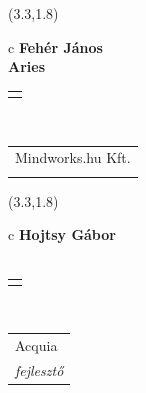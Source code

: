 \documentclass[11pt]{article}
\begin{document}
\makebox(3.3,1.8){
  \renewcommand\arraystretch{1.3}
  \begin{tabular}[c]{c}
    \hspace{8.5mm}
    \LARGE\bf{ Fehér János }\\
    \hspace{8.5mm}
    \Large{ Aries }\\
    \renewcommand\arraystretch{3}
    \begin{tabular}[c]{c}
      \centering
      \fontfamily{phv}\selectfont{
        \textbf{
          \textsc{
            \scriptsize{
            \color{Bright}{ Ismerkedő }\color{Bright}{ Webmester }\color{Bright}{ Sminkmester }\color{Dark}{ Programozó }
            }
          }
        }
      }
    \end{tabular}
    \\
    \renewcommand\arraystretch{1}
    \begin{tabular}{p{3.3in}}
      \hspace{.7cm}Mindworks.hu Kft.\\
      \hspace{.7cm}\emph{  }\\
    \end{tabular}
  \end{tabular}
}

\makebox(3.3,1.8){
  \renewcommand\arraystretch{1.3}
  \begin{tabular}[c]{c}
    \hspace{8.5mm}
    \LARGE\bf{ Hojtsy Gábor }\\
    \hspace{8.5mm}
    \Large{  }\\
    \renewcommand\arraystretch{3}
    \begin{tabular}[c]{c}
      \centering
      \fontfamily{phv}\selectfont{
        \textbf{
          \textsc{
            \scriptsize{
            \color{Bright}{ Ismerkedő }\color{Bright}{ Webmester }\color{Bright}{ Sminkmester }\color{Dark}{ Programozó }
            }
          }
        }
      }
    \end{tabular}
    \\
    \renewcommand\arraystretch{1}
    \begin{tabular}{p{3.3in}}
      \hspace{.7cm}Acquia\\
      \hspace{.7cm}\emph{ fejlesztő }\\
    \end{tabular}
  \end{tabular}
}
\end{document}
